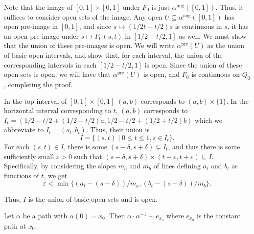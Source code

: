 \documentclass[12 pt, letterpaper]{hmcpset}
\begin{document}
\begin{solution}
	Note that the image of $[0, 1] \times [0, 1]$ under $F_{0}$ is just $\alpha^{\text{img}}([0, 1])$. Thus, it suffices to consider open sets of the image. Any open $U \subseteq \alpha^{\text{img}}([0, 1])$ has open pre-image in $[0, 1]$, and since $s \mapsto (1/2t + t/2)s$ is continuous in $s$, it has an open pre-image under $s \mapsto F_{0}(s, t)$ in $[1/2 - t/2, 1]$ as well. We must show that the union of these pre-images is open. We will write $\alpha^{\text{pre}}(U)$ as the union of basic open intervals, and show that, for each interval, the union of the corresponding intervals in each $[1/2 - t/2, 1]$ is open. Since the union of these open sets is open, we will have that $\alpha^{\text{pre}}(U)$ is open, and $F_{0}$ is continuous on $Q_{0}$, completing the proof.

	In the top interval of $[0, 1] \times [0, 1]$ $(a, b)$ corresponds to $(a, b) \times \{ 1 \}$. In the horizontal interval corresponding to $t$, $(a, b)$ corresponds to $I_{t} = (1/2 - t/2 + (1/2 + t/2) a, 1/2 - t/2 + (1/2 + t/2) b)$ which we abbreviate to $I_{t} = (a_{t}, b_{t})$. Thus, their union is
	\[
		I = \{ (s, t) \mid 0 \le t \le 1, s \in I_{t} \}.
	\]
	For each $(s, t) \in I$, there is some $(s - \delta, s + \delta) \subsetneq I_{t}$, and thus there is some sufficiently small $\varepsilon > 0$ such that $(s - \delta, s + \delta) \times (t - \varepsilon, t + \varepsilon) \subseteq I$. Specifically, by considering the slopes $m_{a}$ and $m_{b}$ of lines defining $a_{t}$ and $b_{t}$ as functions of $t$, we get
	\[
		\varepsilon < \min \{ (a_{t} - (s - \delta)) / m_{a}, (b_{t} - (s + \delta)) / m_{b} \}.
	\]

	Thus, $I$ is the union of basic open sets and is open.
\end{solution}

\pagebreak

\begin{problem}[12.8]
	Let $\alpha$ be a path with  $\alpha(0) = x_{0}$. Then $\alpha \cdot \alpha ^{-1} \sim e_{x_{0}}$ where $e_{x_{0}}$ is the constant path at $x_{0}$.
\end{problem}
\end{document}
